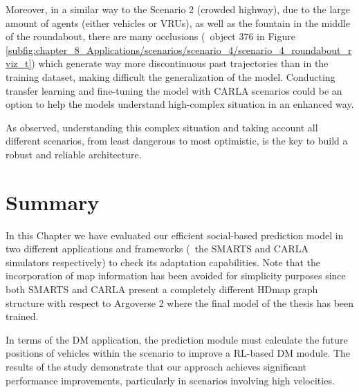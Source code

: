 Moreover, in a similar way to the Scenario 2 (crowded highway), due to the large amount of agents (either vehicles or \acp{VRU}), as well as the fountain in the middle of the roundabout, there are many occlusions (\eg \ object 376 in Figure \ref{subfig:chapter_8_Applications/scenarios/scenario_4/scenario_4_roundabout_rviz_t}) which generate way more discontinuous past trajectories than in the training dataset, making difficult the generalization of the model. Conducting transfer learning and fine-tuning the model with \ac{CARLA} scenarios could be an option to help the models understand high-complex situation in an enhanced way. 

As observed, understanding this complex situation and taking account all different scenarios, from least dangerous to most optimistic, is the key to build a robust and reliable architecture.


\section{Summary}
\label{sec:8_summary}

In this Chapter we have evaluated our efficient social-based prediction model in two different applications and frameworks (\ie \ the \ac{SMARTS} and \ac{CARLA} simulators respectively) to check its adaptation capabilities. Note that the incorporation of map information has been avoided for simplicity purposes since both \ac{SMARTS} and \ac{CARLA} present a completely different \ac{HDmap} graph structure with respect to Argoverse 2 where the final model of the thesis has been trained.

In terms of the \ac{DM} application, the prediction module must calculate the future positions of vehicles within the scenario to improve a \ac{RL}-based \ac{DM} module. The results of the study demonstrate that our approach achieves significant performance improvements, particularly in scenarios involving high velocities.

